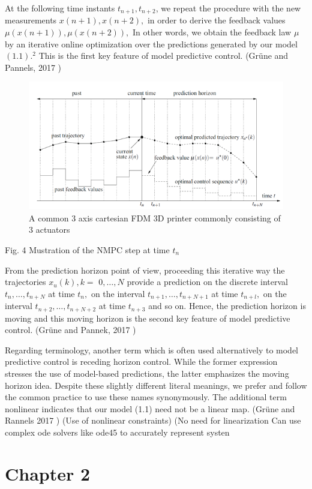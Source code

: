 \documentclass{UoNMCHA}
\numberwithin{equation}{section}
\begin{document}
At the following time instants $t_{n+1}, t_{n+2}$, we repeat the procedure with the new measurements
$x(n+1), x(n+2),$ in order to derive the feedback values $\mu(x(n+1)), \mu(x(n+2)),$ In other words,
we obtain the feedback law $\mu$ by an iterative online optimization over the predictions generated by our
model $(1.1) .^{2}$ This is the first key feature of model predictive control. (Grüne and Pannels, 2017 )

\begin{figure}[H]
	\begin{center}
		\includegraphics[width=.5\linewidth]{figs/Picture7}
		\caption{A  common 3 axis cartesian FDM 3D printer commonly consisting of 3 actuators}
		\label{figs/Picture7}
	\end{center}
\end{figure}

Fig. 4 Mustration of the NMPC step at time $t_{n}$

From the prediction horizon point of view, proceeding this iterative way the trajectories $x_{u}(k), k=$
$0, \ldots, N$ provide a prediction on the discrete interval $t_{n}, \ldots, t_{n+N}$ at time $t_{n},$ on the interval
$t_{n+1}, \ldots, t_{n+N+1}$ at time $t_{n+l},$ on the interval $t_{n+2}, \ldots, t_{n+N+2}$ at time $t_{n+3}$ and so on. Hence, the
prediction horizon is moving and this moving horizon is the second key feature of model predictive
control. (Grüne and Pannek, 2017 )

Regarding terminology, another term which is often used alternatively to model predictive control is
receding horizon control. While the former expression stresses the use of model-based predictions, the
latter emphasizes the moving horizon idea. Despite these slightly different literal meanings, we prefer
and follow the common practice to use these names synonymously. The additional term nonlinear
indicates that our model (1.1) need not be a linear map. (Grüne and Rannels 2017 )
(Use of nonlinear constraints)
(No need for linearization
Can use complex ode solvers like ode45 to accurately represent systen


\newpage
\section*{Chapter 2}
\end{document}
